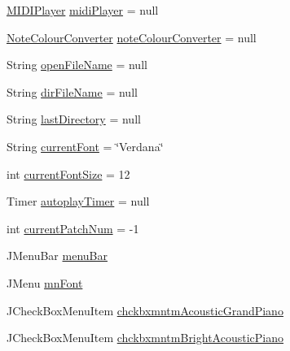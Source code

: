 \begin{DoxyCompactItemize}
\item 
\hyperlink{classcom_1_1lclion_1_1midiplayer_1_1_m_i_d_i_player}{M\+I\+D\+I\+Player} \hyperlink{classcom_1_1lclion_1_1midigui_1_1_j_frame_m_i_d_i_piano_sheet_creator_ab4562caaf138ca21b1013043d3eb158d}{midi\+Player} = null
\item 
\hyperlink{classcom_1_1lclion_1_1midiparser_1_1_note_colour_converter}{Note\+Colour\+Converter} \hyperlink{classcom_1_1lclion_1_1midigui_1_1_j_frame_m_i_d_i_piano_sheet_creator_ab210fa766a5aec2702de6587366989b9}{note\+Colour\+Converter} = null
\item 
String \hyperlink{classcom_1_1lclion_1_1midigui_1_1_j_frame_m_i_d_i_piano_sheet_creator_ae989d6c379f0d116f3811a9d7793e30b}{open\+File\+Name} = null
\item 
String \hyperlink{classcom_1_1lclion_1_1midigui_1_1_j_frame_m_i_d_i_piano_sheet_creator_a1b15f968588be7e6da8f0ffd1c04e6a4}{dir\+File\+Name} = null
\item 
String \hyperlink{classcom_1_1lclion_1_1midigui_1_1_j_frame_m_i_d_i_piano_sheet_creator_a7053fe76095c389b7bbc6d22f2ba5b21}{last\+Directory} = null
\item 
String \hyperlink{classcom_1_1lclion_1_1midigui_1_1_j_frame_m_i_d_i_piano_sheet_creator_a62123d133e7e491e26258033b8b08822}{current\+Font} = \char`\"{}Verdana\char`\"{}
\item 
int \hyperlink{classcom_1_1lclion_1_1midigui_1_1_j_frame_m_i_d_i_piano_sheet_creator_a7f8543b687b957a013ba58ffdd9449f2}{current\+Font\+Size} = 12
\item 
Timer \hyperlink{classcom_1_1lclion_1_1midigui_1_1_j_frame_m_i_d_i_piano_sheet_creator_a172d0561900ff10f21cbf9562fa3c261}{autoplay\+Timer} = null
\item 
int \hyperlink{classcom_1_1lclion_1_1midigui_1_1_j_frame_m_i_d_i_piano_sheet_creator_aa6ae8f708b6cde0c380df6aea7059360}{current\+Patch\+Num} = -\/1
\item 
J\+Menu\+Bar \hyperlink{classcom_1_1lclion_1_1midigui_1_1_j_frame_m_i_d_i_piano_sheet_creator_a654581aa0d77b3f6860722adc9d9fc1d}{menu\+Bar}
\item 
J\+Menu \hyperlink{classcom_1_1lclion_1_1midigui_1_1_j_frame_m_i_d_i_piano_sheet_creator_adc23b01d38b600ce897d16e596c2b868}{mn\+Font}
\item 
J\+Check\+Box\+Menu\+Item \hyperlink{classcom_1_1lclion_1_1midigui_1_1_j_frame_m_i_d_i_piano_sheet_creator_acf27febb9f46a2cb5b78ecb7e283e243}{chckbxmntm\+Acoustic\+Grand\+Piano}
\item 
J\+Check\+Box\+Menu\+Item \hyperlink{classcom_1_1lclion_1_1midigui_1_1_j_frame_m_i_d_i_piano_sheet_creator_aafdf4f78ebd2521a1ec7f34e1e06e4a9}{chckbxmntm\+Bright\+Acoustic\+Piano}

\end{DoxyCompactItemize}
